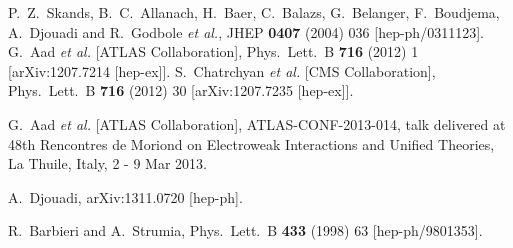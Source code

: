 \documentclass[final,3p,times,pdflatex]{elsarticle}
\begin{document}
\begin{thebibliography}{10}
  P.~Z.~Skands, B.~C.~Allanach, H.~Baer, C.~Balazs, G.~Belanger, F.~Boudjema, A.~Djouadi and R.~Godbole {\it et al.},
  JHEP {\bf 0407} (2004) 036
  [hep-ph/0311123].
  G.~Aad {\it et al.}  [ATLAS Collaboration],
  Phys.\ Lett.\ B {\bf 716} (2012) 1
  [arXiv:1207.7214 [hep-ex]].
  S.~Chatrchyan {\it et al.}  [CMS Collaboration],
  Phys.\ Lett.\ B {\bf 716} (2012) 30
  [arXiv:1207.7235 [hep-ex]].

G.~Aad {\it et al.}  [ATLAS Collaboration],
ATLAS-CONF-2013-014, talk delivered at 48th Rencontres de Moriond on Electroweak Interactions and Unified Theories, La Thuile, Italy, 2 - 9 Mar 2013.


  A.~Djouadi,
  arXiv:1311.0720 [hep-ph].

  R.~Barbieri and A.~Strumia,
  Phys.\ Lett.\ B {\bf 433} (1998) 63
  [hep-ph/9801353].


\end{thebibliography}
\end{document}

